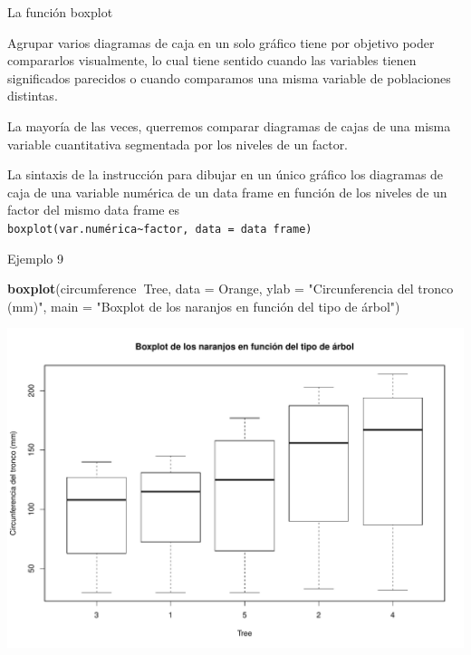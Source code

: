 \documentclass[
  ignorenonframetext,
]{beamer}
\newenvironment{Shaded}{\begin{snugshade}}{\end{snugshade}}
\newcommand{\DataTypeTok}[1]{\textcolor[rgb]{0.13,0.29,0.53}{#1}}
\newcommand{\KeywordTok}[1]{\textcolor[rgb]{0.13,0.29,0.53}{\textbf{#1}}}
\newcommand{\NormalTok}[1]{#1}
\newcommand{\OperatorTok}[1]{\textcolor[rgb]{0.81,0.36,0.00}{\textbf{#1}}}
\newcommand{\StringTok}[1]{\textcolor[rgb]{0.31,0.60,0.02}{#1}}
\begin{document}
\begin{frame}[fragile]{La función boxplot}
\protect\hypertarget{la-funciuxf3n-boxplot-3}{}

Agrupar varios diagramas de caja en un solo gráfico tiene por objetivo
poder compararlos visualmente, lo cual tiene sentido cuando las
variables tienen significados parecidos o cuando comparamos una misma
variable de poblaciones distintas.

La mayoría de las veces, querremos comparar diagramas de cajas de una
misma variable cuantitativa segmentada por los niveles de un factor.

La sintaxis de la instrucción para dibujar en un único gráfico los
diagramas de caja de una variable numérica de un data frame en función
de los niveles de un factor del mismo data frame es
\texttt{boxplot(var.numérica\textasciitilde{}factor,\ data\ =\ data\ frame)}

\end{frame}

\begin{frame}[fragile]{Ejemplo 9}
\protect\hypertarget{ejemplo-9}{}

\begin{Shaded}
\begin{Highlighting}[]
\KeywordTok{boxplot}\NormalTok{(circumference}\OperatorTok{~}\NormalTok{Tree, }\DataTypeTok{data =}\NormalTok{ Orange, }\DataTypeTok{ylab =} \StringTok{"Circunferencia del tronco (mm)"}\NormalTok{, }
        \DataTypeTok{main =} \StringTok{"Boxplot de los naranjos en función del tipo de árbol"}\NormalTok{)}
\end{Highlighting}
\end{Shaded}

\includegraphics{Tema8.-Datos-Cuantitativos_files/figure-beamer/unnamed-chunk-29-1.pdf}

\end{frame}
\end{document}
